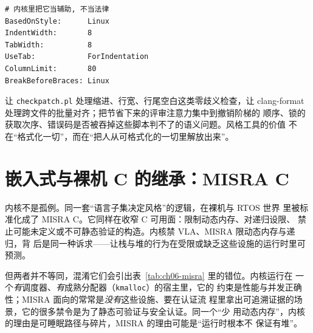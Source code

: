 \documentclass[12pt,a4paper,fontset=fandol]{ctexbook}
\newcommand{\Tp}[1]{\texttt{#1}}
\newcommand{\Lang}[1]{\textsf{#1}}
\begin{document}
\begin{lstlisting}[style=yamlstyle,caption={一份 BasedOnStyle=Linux 的 clang-format 基线，注意 UseTab 与 ColumnLimit 呼应前文的物理约束},label={lst:ch06-clangfmt}]
# 内核里把它当辅助, 不当法律
BasedOnStyle:      Linux
IndentWidth:       8
TabWidth:          8
UseTab:            ForIndentation
ColumnLimit:       80
BreakBeforeBraces: Linux
\end{lstlisting}

\begin{bestpractice}[title={用工具筛掉可机检项，把评审精力留给不可机检项}]
让 \Tp{checkpatch.pl} 处理缩进、行宽、行尾空白这类零歧义检查，让
clang-format 处理跨文件的批量对齐；把节省下来的评审注意力集中到撤销阶梯的
顺序、锁的获取次序、错误码是否被吞掉这些脚本判不了的语义问题。风格工具的价值
不在``格式化一切''，而在``把人从可格式化的一切里解放出来''。
\end{bestpractice}

\section{嵌入式与裸机 C 的继承：MISRA C}
\label{sec:ch06-misra}

内核不是孤例。同一套``语言子集决定风格''的逻辑，在裸机与 RTOS 世界
里被标准化成了 MISRA C。它同样在收窄 \Lang{C} 可用面：限制动态内存、对递归设限、
禁止可能未定义或不可静态验证的构造。内核禁 VLA、MISRA 限动态内存与递归，背
后是同一种诉求——让栈与堆的行为在受限或缺乏这些设施的运行时里可预测。

但两者并不等同，混淆它们会引出表~\ref{tab:ch06-misra} 里的错位。内核运行在
一个\textit{有}调度器、\textit{有}成熟分配器（\Tp{kmalloc}）的宿主里，它的
约束是性能与并发正确性；MISRA 面向的常常是\textit{没有}这些设施、要在认证流
程里拿出可追溯证据的场景，它的很多禁令是为了静态可验证与安全认证。同一个``少
用动态内存''，内核的理由是可睡眠路径与碎片，MISRA 的理由可能是``运行时根本不
保证有堆''。
\end{document}
